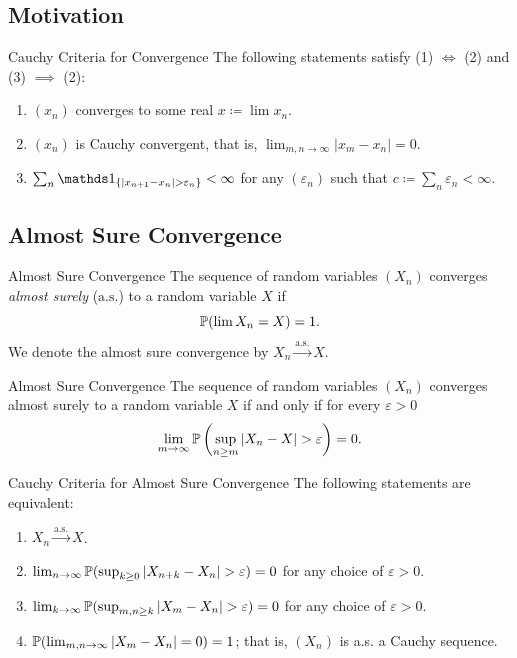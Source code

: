 \subsection{Motivation}
\begin{prop}{Cauchy Criteria for Convergence}{}
	The following statements satisfy (1) $\iff$ (2) and (3) $\implies$ (2):
	\begin{enumerate}
		\item $(x_n)$ converges to some real $x \coloneqq \lim x_n$.
		\item $(x_n)$ is Cauchy convergent, that is, $\lim_{m,n \to \infty} |x_m - x_n| = 0$.
		\item $\sum_n \I_{\{|x_{n+1} - x_n| > \varepsilon_n\}} < \infty$ for any $(\varepsilon_n)$ such that $c \coloneqq \sum_n \varepsilon_n < \infty$.
	\end{enumerate}
\end{prop}

\subsection{Almost Sure Convergence}

\begin{defn}{Almost Sure Convergence}{}
	The sequence of random variables $(X_n)$ converges \textit{almost surely} ($\text{a.s.}$) to a random variable $X$ if
	\begin{equation*}
		\mathbb{P}(\lim X_n = X) = 1.
	\end{equation*}
	We denote the almost sure convergence by $X_n \xrightarrow{\text{a.s.}} X$.
\end{defn}

\begin{thm}{Almost Sure Convergence}{}
	The sequence of random variables $(X_n)$ converges almost surely to a random variable $X$ if and only if for every $\varepsilon > 0$
	\begin{equation}
		\lim_{m \to \infty} \mathbb{P} \left( \sup_{n \ge m} |X_n - X| > \varepsilon \right) = 0.
		\label{eq:AlmostSureConvergenceCriteria}
	\end{equation}
\end{thm}

\begin{prop}{Cauchy Criteria for Almost Sure Convergence}{}
	The following statements are equivalent:
	\begin{enumerate}
		\item $X_n \xrightarrow{\text{a.s.}} X$.
		\item $\lim_{n \to \infty} \mathbb{P}(\sup_{k \ge 0} |X_{n+k} - X_n| > \varepsilon) = 0$ for any choice of $\varepsilon > 0$.
		\item $\lim_{k \to \infty} \mathbb{P}(\sup_{m, n \ge k} |X_m - X_n| > \varepsilon) = 0$ for any choice of $\varepsilon > 0$.
		\item $\mathbb{P}(\lim_{m, n \to \infty} |X_m - X_n| = 0) = 1$; that is, $(X_n)$ is a.s. a Cauchy sequence.
	\end{enumerate}
\end{prop}

